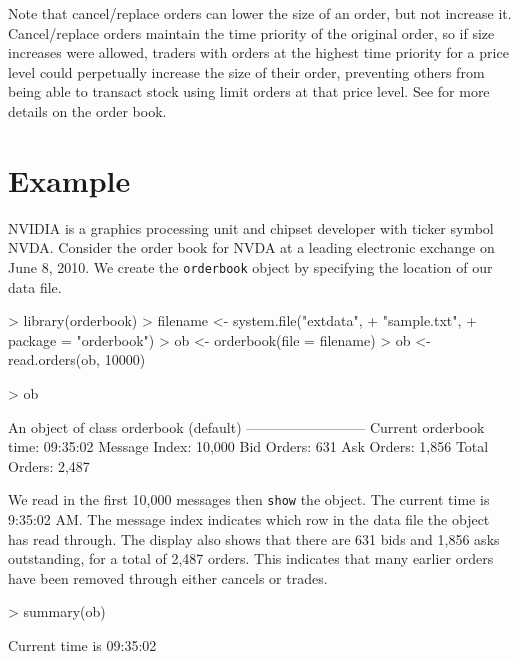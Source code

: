 \documentclass[a4paper]{report}
\begin{document}
\begin{article}
Note that cancel/replace orders can lower the size of an order, but
not increase it. Cancel/replace orders maintain the time priority of
the original order, so if size increases were allowed, traders with
orders at the highest time priority for a price level could
perpetually increase the size of their order, preventing others from
being able to transact stock using limit orders at that price
level. See \cite{johnson:barry} for more details on the order book.

\section{Example}

NVIDIA is a graphics processing unit and chipset developer with ticker
symbol NVDA. Consider the order book for NVDA at a leading electronic
exchange on June 8, 2010. We create the \texttt{orderbook} object by
specifying the location of our data file.

\begin{Schunk}
\begin{Sinput}
> library(orderbook)
> filename <- system.file("extdata",
+                         "sample.txt",
+                         package = "orderbook")
> ob <- orderbook(file = filename)
> ob <- read.orders(ob, 10000)
\end{Sinput}
\end{Schunk}
\begin{Schunk}
\begin{Sinput}
> ob
\end{Sinput}
\begin{Soutput}
An object of class orderbook (default)
--------------------------
Current orderbook time:    09:35:02 
Message Index:             10,000 
Bid Orders:                631 
Ask Orders:                1,856 
Total Orders:              2,487 
\end{Soutput}
\end{Schunk}

We read in the first 10,000 messages then \texttt{show} the object.
The current time is 9:35:02 AM. The message index indicates which row
in the data file the object has read through. The display also shows
that there are 631 bids and 1,856 asks outstanding, for a total of
2,487 orders. This indicates that many earlier orders have been
removed through either cancels or trades.

\begin{Schunk}
\begin{Sinput}
> summary(ob)
\end{Sinput}
\begin{Soutput}
Current time is 09:35:02 


\end{Soutput}
\end{Schunk}
\end{article}
\end{document}
